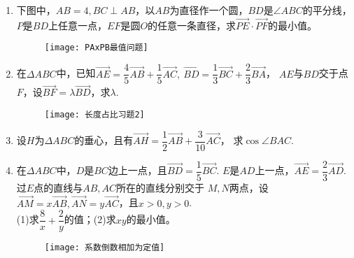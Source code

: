 \begin{enumerate}[label={\textbf{\arabic*.}},leftmargin=
    \inteval{\myenumleftmargin}pt]
\item 下图中，$ AB=4,BC \perp AB $，以$ AB $为直径作一个圆，$ BD $是$ \angle ABC $的平分线，$ P $是$ BD $上任意一点，$ EF $是圆$ O $的任意一条直径，求$ \vec{PE}\cdot \vec{PF} $的最小值。
\begin{figure}[h]
    \centering
    \texttt{[image: PAxPB最值问题]}
\end{figure}

\item 在$ \Delta ABC $中，已知$ \vec{AE}=\dfrac{4}{5}
\vec{AB}+\dfrac{1}{5}\vec{AC},\ \vec{BD}=
\dfrac{1}{3}\vec{BC}+\dfrac{2}{3}\vec{BA} $，
$ AE $与$ BD $交于点$ F $，设$ \vec{BF}=\lambda 
\vec{BD} $，求$ \lambda $. 
\begin{figure}[h]
    \centering
    \texttt{[image: 长度占比习题2]}
\end{figure}

\item 设$ H $为$ \Delta ABC $的垂心，且有$ \vec{AH}=
\dfrac{1}{2}\vec{AB}+\dfrac{3}{10}\vec{AC} $，
求$ \cos \angle BAC $. 

\item 在$ \Delta ABC $中，$ D $是$ BC $边上一点，且$ \vec{BD}=
\dfrac{1}{5}\vec{BC} $. $ E $是$ AD $上一点，$ \vec{AE} =
\dfrac{2}{3}\vec{AD} $. 过$ E $点的直线与$ AB,AC $所在的直线分别交于
$ M,N $两点，设$ \vec{AM}=x\vec{AB},\vec{AN}=
y\vec{AC} $，且$ x>0,y>0 $. \\
(1)求$ \dfrac{8}{x}+\dfrac{2}{y} $的值；(2)求$ xy $的最小值。
\begin{figure}[!htbp]
    \centering
    \texttt{[image: 系数倒数相加为定值]}
\end{figure} 

\end{enumerate}


